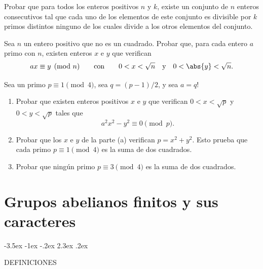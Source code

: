 \documentclass[12pt,a4paper]{book}
\makeatletter
\renewcommand\section{\@startsection{section}{1}{\z@}%
  {-3.5ex \@plus -1ex \@minus -.2ex}%
  {2.3ex \@plus .2ex}%
  {\normalfont\Large\bfseries\raggedright}}
\makeatother
\begin{document}
    \begin{ejercicio}
        Probar que para todos los enteros positivos $n$ y $k$, existe un conjunto de $n$
        enteros consecutivos tal que cada uno de los elementos de este conjunto es
        divisible por $k$ primos distintos ninguno de los cuales divide a los otros
        elementos del conjunto.
    \end{ejercicio}

    \begin{ejercicio}
        Sea $n$ un entero positivo que no es un cuadrado. Probar que, para cada entero $a$
        primo con $n$, existen enteros $x$ e $y$ que verifican
        \begin{equation*}
            ax\equiv y\pmod{n}\qquad\text{con}\qquad0<x<\sqrt{n}\quad\text{y}\quad
            0<\abs{y}<\sqrt{n}.
        \end{equation*}
    \end{ejercicio}

    \begin{ejercicio}
        Sea un primo $p\equiv1\pmod{4}$, sea $q=(p-1)/2$, y sea $a=q!$
        \begin{enumerate}
            \item[(a)] Probar que existen enteros positivos $x$ e $y$ que verifican
            $0<x<\sqrt{p}$ y $0<y<\sqrt{p}$ tales que
            \begin{equation*}
                a^{2}x^{2}-y^{2}\equiv0\pmod{p}.
            \end{equation*}
            \item[(b)] Probar que los $x$ e $y$ de la parte (a) verifican $p=x^{2}+y^{2}$. Esto
            prueba que cada primo $p\equiv1\pmod{4}$ es la suma de dos cuadrados.
            \item[(c)] Probar que ningún primo $p\equiv3\pmod{4}$ es la suma de dos
            cuadrados.
        \end{enumerate}
    \end{ejercicio}

\chapter{Grupos abelianos finitos y sus caracteres}

    \section{DEFINICIONES}
\end{document}

